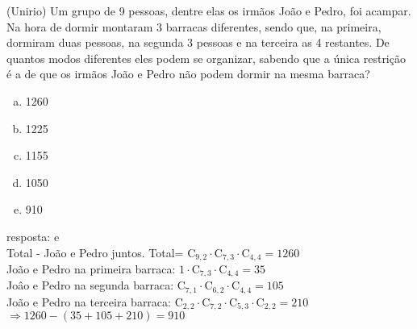 \begin{ex}
 (Unirio) Um grupo de 9 pessoas, dentre elas os irmãos João e Pedro, foi acampar. Na  hora de dormir montaram 3 barracas diferentes, sendo que, na primeira, dormiram duas pessoas, na segunda 3 pessoas e na terceira as 4 restantes. De quantos modos diferentes eles podem se organizar, sabendo que a única restrição é a de que os irmãos João e Pedro não podem dormir na mesma barraca?
    \begin{enumerate}[(a)]
    \item 1260
    \item 1225
    \item 1155
    \item 1050
    \item 910
    \end{enumerate}
      \begin{sol}
       resposta: e \\
       Total - João e Pedro juntos.
       Total= $\mathrm{C}_{9,2}\cdot\mathrm{C}_{7,3}\cdot\mathrm{C}_{4,4}= 1260$ \\
       João e Pedro na primeira barraca: $1\cdot\mathrm{C}_{7,3}\cdot\mathrm{C}_{4,4}=35$\\
       Joâo e Pedro na segunda barraca: $\mathrm{C}_{7,1}\cdot\mathrm{C}_{6,2}\cdot\mathrm{C}_{4,4}=105$ \\
       João e Pedro na terceira barraca: $\mathrm{C}_{2,2}\cdot\mathrm{C}_{7,2}\cdot\mathrm{C}_{5,3}\cdot\mathrm{C}_{2,2}= 210$ \\
       $\Longrightarrow 1260 - (35 +105+210)=910$
      \end{sol}
\end{ex}
